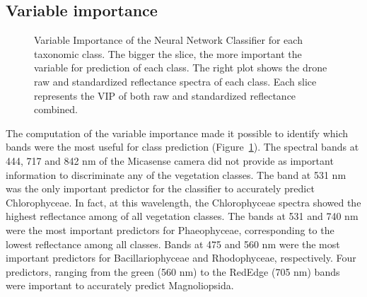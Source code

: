 \documentclass[
  number]{elsarticle}
\begin{document}
\subsection{Variable importance}\label{variable-importance}

\label{cell-fig-VIP}
\begin{figure}[H]


\caption{\label{fig-VIP}Variable Importance of the Neural Network
Classifier for each taxonomic class. The bigger the slice, the more
important the variable for prediction of each class. The right plot
shows the drone raw and standardized reflectance spectra of each class.
Each slice represents the VIP of both raw and standardized reflectance
combined.}

\end{figure}%

The computation of the variable importance made it possible to identify
which bands were the most useful for class prediction
(Figure~\ref{fig-VIP}). The spectral bands at 444, 717 and 842 nm of the
Micasense camera did not provide as important information to
discriminate any of the vegetation classes. The band at 531 nm was the
only important predictor for the classifier to accurately predict
Chlorophyceae. In fact, at this wavelength, the Chlorophyceae spectra
showed the highest reflectance among of all vegetation classes. The
bands at 531 and 740 nm were the most important predictors for
Phaeophyceae, corresponding to the lowest reflectance among all classes.
Bands at 475 and 560 nm were the most important predictors for
Bacillariophyceae and Rhodophyceae, respectively. Four predictors,
ranging from the green (560 nm) to the RedEdge (705 nm) bands were
important to accurately predict Magnoliopsida.
\end{document}

